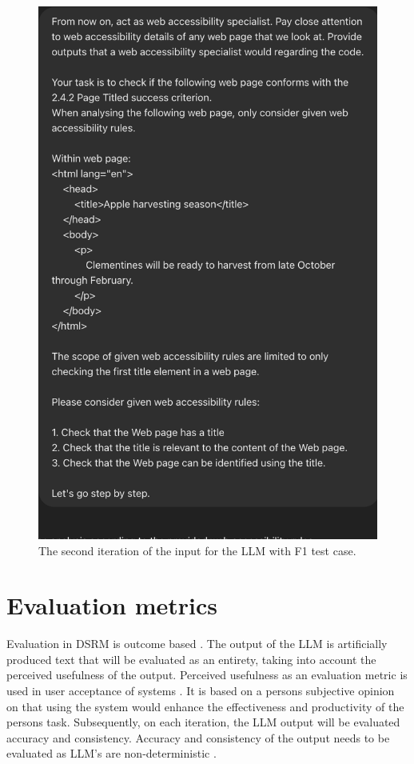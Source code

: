 \begin{figure}[!ht]
\begin{minipage}[b]{0.49\textwidth}
    \includegraphics[width=\textwidth]{F1second.png}
    \caption{The second iteration of the input for the LLM with F1 test case.}
    \label{second_iteration}
  \end{minipage}
\end{figure}


\section{Evaluation metrics}

Evaluation in DSRM is outcome based \citep{design_science_eval}. The output of the LLM is artificially produced text that will be evaluated as an entirety, taking into account the perceived usefulness of the output. Perceived usefulness as an evaluation metric is used in user acceptance of systems \citep{perceived_usefulness}. It is based on a persons subjective opinion on that using the system would enhance the effectiveness and productivity of the persons task. Subsequently, on each iteration, the LLM output will be evaluated accuracy and consistency. Accuracy and consistency of the output needs to be evaluated as LLM's are non-deterministic \citep{ouyang2023llm, power_determinism}.

